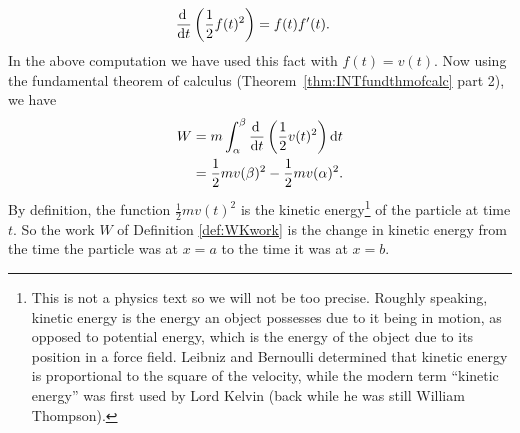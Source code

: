 \begin{align*}
  \diff{}{t}\left( \frac{1}{2} f(t)^2 \right) &= f(t) f'(t).
\end{align*}
In the above computation we have used this fact with $f(t) = v(t)$. Now using the
fundamental theorem of calculus (Theorem~\ref{thm:INTfundthmofcalc} part 2), we have
\begin{align*}
W&= m \int_\alpha^\beta \diff{}{t} \left( \frac{1}{2} v(t)^2 \right) \dee{t}\\
&= \frac{1}{2} mv(\beta)^2 - \frac{1}{2}mv(\alpha)^2.
\end{align*}
By definition, the function $\frac{1}{2} mv(t)^2$ is the kinetic
energy\footnote{This is not a physics text so we will not be too precise. Roughly
speaking, kinetic energy is the energy an object possesses due to it being in motion, as
opposed to potential energy, which is the energy of the object due to its position in a
force field. Leibniz and Bernoulli determined that kinetic energy is proportional to the
square of the velocity, while the modern term ``kinetic energy'' was first used by Lord
Kelvin (back while he was still William Thompson).} of the particle at time $t$. So the
work $W$ of Definition \ref{def:WKwork} is the change in kinetic energy
from the time the particle was at $x=a$ to the time it was at $x=b$.


